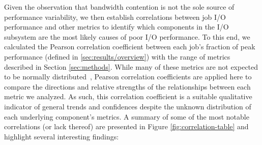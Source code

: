 Given the observation that bandwidth contention is not the sole source of performance variability, 
we then establish correlations between job I/O performance and other metrics to identify which components in the I/O subsystem are the most likely causes of poor I/O performance.
To this end, we calculated the Pearson correlation coefficient between each job's fraction of peak performance (defined in \ref{sec:results/overview}) with the range of metrics described in Section \ref{sec:methods}.
While many of these metrics are not expected to be normally distributed~\cite{Kim2010}, Pearson correlation coefficients are applied here to compare the directions and relative strengths of the relationships between each metric we analyzed.
As such, this correlation coefficient is a suitable qualitative indicator of general trends and confidences despite the unknown distribution of each underlying component's metrics.
A summary of some of the most notable correlations (or lack thereof) are presented in Figure \ref{fig:correlation-table} and highlight several interesting findings:

